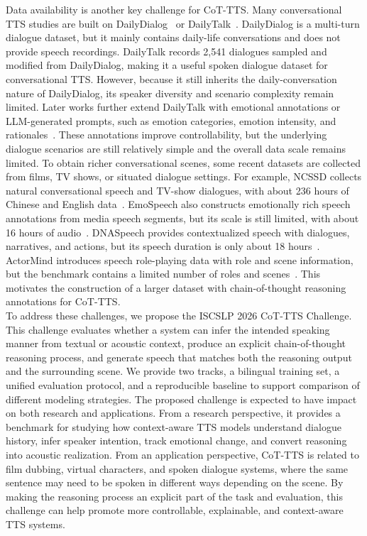 \documentclass[a4paper]{article}
\begin{document}
\noindent Data availability is another key challenge for CoT-TTS. Many conversational TTS studies are built on DailyDialog~\cite{li2017dailydialog} or DailyTalk~\cite{lee2023dailytalk}.
DailyDialog is a multi-turn dialogue dataset, but it mainly contains daily-life conversations and does not provide speech recordings. DailyTalk records 2,541 dialogues sampled and modified from DailyDialog, making it a useful spoken dialogue dataset for conversational TTS. However, because it still inherits the daily-conversation nature of DailyDialog, its speaker diversity and scenario complexity remain limited. Later works further extend DailyTalk with emotional annotations or LLM-generated prompts, such as emotion categories, emotion intensity, and rationales~\cite{liu2024emotion,jeon2025prompt}. These annotations improve controllability, but the underlying dialogue scenarios are still relatively simple and the overall data scale remains limited. To obtain richer conversational scenes, some recent datasets are collected from films, TV shows, or situated dialogue settings. For example, NCSSD collects natural conversational speech and TV-show dialogues, with about 236 hours of Chinese and English data~\cite{liu2024generative}. EmoSpeech also constructs emotionally rich speech annotations from media speech segments, but its scale is still limited, with about 16 hours of audio~\cite{bian2024emospeech}. DNASpeech provides contextualized speech with dialogues, narratives, and actions, but its speech duration is only about 18 hours~\cite{cheng2025dnaspeech}. ActorMind introduces speech role-playing data with role and scene information, but the benchmark contains a limited number of roles and scenes~\cite{chen2026actormind}. This motivates the construction of a larger dataset with chain-of-thought reasoning annotations for CoT-TTS.\\

\noindent To address these challenges, we propose the ISCSLP 2026 CoT-TTS Challenge. This challenge evaluates whether a system can infer the intended speaking manner from textual or acoustic context, produce an explicit chain-of-thought reasoning process, and generate speech that matches both the reasoning output and the surrounding scene. We provide two tracks, a bilingual training set, a unified evaluation protocol, and a reproducible baseline to support comparison of different modeling strategies. The proposed challenge is expected to have impact on both research and applications. From a research perspective, it provides a benchmark for studying how context-aware TTS models understand dialogue history, infer speaker intention, track emotional change, and convert reasoning into acoustic realization. From an application perspective, CoT-TTS is related to film dubbing, virtual characters, and spoken dialogue systems, where the same sentence may need to be spoken in different ways depending on the scene. By making the reasoning process an explicit part of the task and evaluation, this challenge can help promote more controllable, explainable, and context-aware TTS systems.
\end{document}
